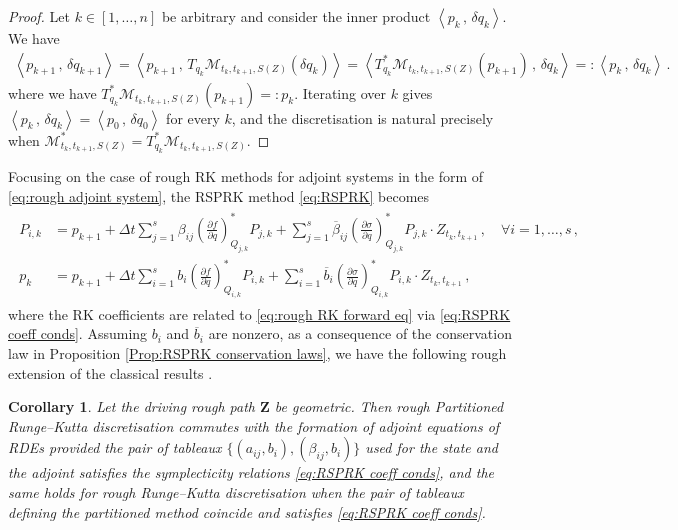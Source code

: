 \documentclass[11pt, oneside]{article}
\numberwithin{equation}{section}
\newtheorem{corollary}[lemma]{Corollary}
\theoremstyle{definition}
\newcommand{\ob}[1]{\overline{#1}}
\newcommand{\mc}[1]{\mathcal{#1}}
\newcommand{\mcal}[1]{\mc{#1}}
\newcommand{\scp}[2]{{\left\langle {#1}\, , \, {#2}\right\rangle}}
\def\p{{\partial}}
\def\p{\partial}
\begin{document}
\begin{proof}
    Let $k \in [1,\ldots,n]$ be arbitrary and consider the inner product $\scp{p_k}{\delta q_k}$. We have
    \begin{align*}
    	\scp{p_{k+1}}{\delta q_{k+1}} = \scp{p_{k+1}}{T_{q_k}\mcal{M}_{t_k, t_{k+1}, S(Z)}(\delta q_k)}  =  \scp{T^*_{q_k}\mcal{M}_{t_k, t_{k+1}, S(Z)} (p_{k+1})}{\delta q_k} =: \scp{p_k}{\delta q_k} \,.
    \end{align*}
    where we have $T^*_{q_k}\mcal{M}_{t_k, t_{k+1}, S(Z)} (p_{k+1}) =: p_k$. Iterating over $k$ gives $\scp{p_k}{\delta q_k} = \scp{p_0}{\delta q_0}$ for every $k$, and the discretisation is natural precisely when $\mcal{M}^*_{t_k, t_{k+1}, S(Z)} = T_{q_k}^*\mcal{M}_{t_k, t_{k+1}, S(Z)}$.
\end{proof}
Focusing on the case of rough RK methods for adjoint systems in the form of \eqref{eq:rough adjoint system}, the RSPRK method \eqref{eq:RSPRK} becomes 
\begin{align}
\begin{split}
    P_{i,k} &= p_{k+1} + \Delta t \sum_{j=1}^s \beta_{ij} \left( \frac{\p f}{\p q}\right)^*_{Q_{j,k}} P_{j,k} + \sum_{j=1}^s \ob{\beta}_{ij} \left( \frac{\p \sigma}{\p q}\right)^*_{Q_{j,k}} P_{j,k}\cdot Z_{t_k, t_{k+1}} \,,\quad \forall i = 1,\ldots,s\,,\\
    p_k &= p_{k+1} + \Delta t \sum_{i=1}^s b_i  \left( \frac{\p f}{\p q}\right)^*_{Q_{i,k}} P_{i,k} + \sum_{i=1}^s \ob{b}_i  \left( \frac{\p \sigma}{\p q}\right)^*_{Q_{i,k}} P_{i,k} \cdot Z_{t_k, t_{k+1}} \,,
\end{split}
\end{align}
where the RK coefficients are related to \eqref{eq:rough RK forward eq} via \eqref{eq:RSPRK coeff conds}. Assuming $b_i$ and $\ob{b}_i$ are nonzero, as a consequence of the conservation law in Proposition \ref{Prop:RSPRK conservation laws}, we have the following rough extension of the classical results \cite[Thm. 3.3 \& 3.4]{Sanz-Serna2016}.
\begin{corollary}\label{cor:rk adjoint commutes}
    Let the driving rough path $\mathbf{Z}$ be geometric. Then rough Partitioned Runge--Kutta discretisation commutes with the formation of adjoint equations of RDEs provided the pair of tableaux $\{(a_{ij}, b_i), (\beta_{ij}, b_i)\}$ used for the state and the adjoint satisfies the symplecticity relations \eqref{eq:RSPRK coeff conds}, and the same holds for rough Runge--Kutta discretisation when the pair of tableaux defining the partitioned method coincide and satisfies \eqref{eq:RSPRK coeff conds}.
\end{corollary}
\end{document}
